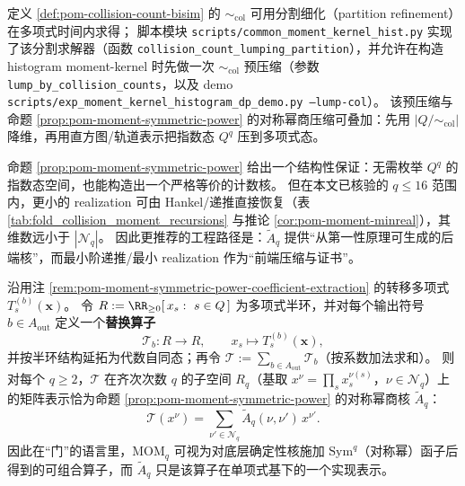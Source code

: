 \begin{remark}\label{rem:pom-moment-col-lumping-impl}
定义 \ref{def:pom-collision-count-bisim} 的 \(\sim_{\mathrm{col}}\) 可用分割细化（partition refinement）在多项式时间内求得；
脚本模块 \texttt{scripts/common\_moment\_kernel\_hist.py} 实现了该分割求解器（函数 \texttt{collision\_count\_lumping\_partition}），并允许在构造 histogram moment-kernel 时先做一次 \(\sim_{\mathrm{col}}\) 预压缩（参数 \texttt{lump\_by\_collision\_counts}，以及 demo \texttt{scripts/exp\_moment\_kernel\_histogram\_dp\_demo.py --lump-col}）。
该预压缩与命题 \ref{prop:pom-moment-symmetric-power} 的对称幂商压缩可叠加：先用 \(|Q/{\sim_{\mathrm{col}}}|\) 降维，再用直方图/轨道表示把指数态 \(Q^q\) 压到多项式态。
\end{remark}

\begin{remark}\label{rem:pom-moment-symmetric-power-impl}
命题 \ref{prop:pom-moment-symmetric-power} 给出一个结构性保证：无需枚举 \(Q^q\) 的指数态空间，也能构造出一个严格等价的计数核。
但在本文已核验的 \(q\le 16\) 范围内，更小的 realization 可由 Hankel/递推直接恢复（表 \ref{tab:fold_collision_moment_recursions} 与推论 \ref{cor:pom-moment-minreal}），其维数远小于 \(|\mathcal{N}_q|\)。
因此更推荐的工程路径是：\(\widetilde A_q\) 提供“从第一性原理可生成的后端核”，而最小阶递推/最小 realization 作为“前端压缩与证书”。
\end{remark}

\begin{remark}\label{rem:pom-moment-symmetric-power-substitution-operator}
沿用注 \ref{rem:pom-moment-symmetric-power-coefficient-extraction} 的转移多项式 \(T^{(b)}_s(\mathbf{x})\)。
令 \(R:=\RR_{\ge 0}[\,x_s:\ s\in Q\,]\) 为多项式半环，并对每个输出符号 \(b\in A_{\mathrm{out}}\) 定义一个\textbf{替换算子}
\[
\mathcal{T}_b:R\to R,\qquad
x_s\longmapsto T^{(b)}_s(\mathbf{x}),
\]
并按半环结构延拓为代数自同态；再令 \(\mathcal{T}:=\sum_{b\in A_{\mathrm{out}}}\mathcal{T}_b\)（按系数加法求和）。
则对每个 \(q\ge 2\)，\(\mathcal{T}\) 在齐次次数 \(q\) 的子空间 \(R_q\)（基取 \(x^\nu=\prod_s x_s^{\nu(s)}\)，\(\nu\in\mathcal{N}_q\)）上的矩阵表示恰为命题 \ref{prop:pom-moment-symmetric-power} 的对称幂商核 \(\widetilde A_q\)：
\[
\mathcal{T}(x^\nu)=\sum_{\nu'\in\mathcal{N}_q}\widetilde A_q(\nu,\nu')\,x^{\nu'}.
\]
因此在“门”的语言里，\(\mathrm{MOM}_q\) 可视为对底层确定性核施加 \(\mathrm{Sym}^q\)（对称幂）函子后得到的可组合算子，而 \(\widetilde A_q\) 只是该算子在单项式基下的一个实现表示。
\end{remark}

